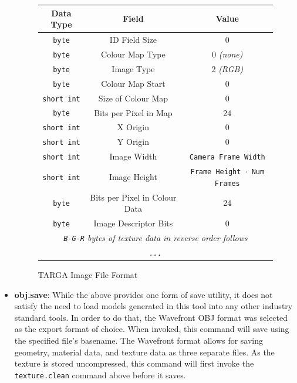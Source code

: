 \documentclass[a4paper,10pt]{article}
\begin{document}
\begin{itemize}
\begin{figure}
  \begin{center}
    \begin{tabular}{| c | c || c|} \hline
      \textbf{Data Type} & \textbf{Field} & \textbf{Value} \\ \hline
      \texttt{byte} & ID Field Size & 0 \\ \hline
      \texttt{byte} & Colour Map Type & 0 \textit{(none)} \\ \hline
      \texttt{byte} & Image Type & 2 \textit{(RGB)} \\ \hline
      \texttt{byte} & Colour Map Start & 0 \\ \hline
      \texttt{short int} & Size of Colour Map & 0 \\ \hline
      \texttt{byte} & Bits per Pixel in Map & 24 \\ \hline
      \texttt{short int} & X Origin & 0 \\ \hline
      \texttt{short int} & Y Origin & 0 \\ \hline
      \texttt{short int} & Image Width & \texttt{Camera Frame Width} \\ \hline
      \texttt{short int} & Image Height & \texttt{Frame Height $\cdot$ Num Frames} \\ \hline
      \texttt{byte} & Bits per Pixel in Colour Data & 24 \\ \hline
      \texttt{byte} & Image Descriptor Bits & 0 \\  \hline
      \multicolumn{3}{|c|}{\textit{\texttt{B-G-R} bytes of texture data in reverse order follows}} \\
      \multicolumn{3}{|c|}{\textit{\texttt{...}}}
    \end{tabular}
  \label{tga}
  \end{center}
  \caption{TARGA Image File Format}
\end{figure}

\item{\textbf{obj.save}: While the above provides one form of save utility, it does not satisfy the need to load models generated in this tool into any other industry standard tools. In order to do that, the Wavefront OBJ format\cite{objmtl} was selected as the export format of choice. When invoked, this command will save using the specified file's basename. The Wavefront format allows for saving geometry, material data, and texture data as three separate files. As the texture is stored uncompressed, this command will first invoke the \texttt{texture.clean} command above before it saves. 

}
\end{itemize}
\end{document}
